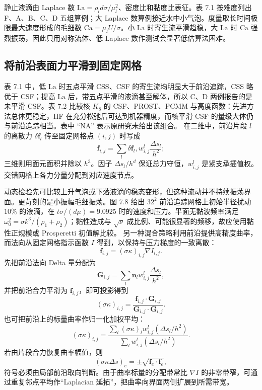 \documentclass[11pt,a4paper,openany,fontset=none]{ctexbook}
\begin{document}
静止液滴由 Laplace 数 $\mathrm{La}=\rho_l d\sigma/\mu_l^2$、密度比和黏度比表征。表 7.1 按难度列出 F、A、B、C、D 五组算例；大 Laplace 数算例接近水中小气泡。度量取长时间极限最大速度形成的毛细数 $\mathrm{Ca}=\mu_lU/\sigma$。小 $\mathrm{La}$ 时寄生流平滑趋稳，大 $\mathrm{La}$ 时 $\mathrm{Ca}$ 强烈振荡，因此只用对称流体、低 Laplace 数作测试会显著低估算法困难。
\subsection{将前沿表面力平滑到固定网格}

表 7.1 中，低 $\mathrm{La}$ 时五点平滑 CSS、CSF 的寄生流均明显大于前沿追踪，CSS 略优于 CSF；提高 $\mathrm{La}$ 后，带五点平滑的液滴甚至解体，所以 C、D 两例报告的是未平滑 CSF。表 7.2 比较核 $K_8$ 的 CSF、PROST、PCMM 与高度函数：先进方法总体更稳定，HF 在充分松弛后可达到机器精度，而核平滑 CSF 的量级大体仍与前沿追踪相当。表中 ``NA'' 表示原研究未给出该组合。
在二维中，前沿片段 $l$ 的离散力 $\delta\boldsymbol f_l$ 传至固定网格点 $(i,j)$ 时写成
\begin{equation}
 \boldsymbol f_{i,j}=\sum_l\delta\boldsymbol f_l,w^l_{i,j}
 \frac{\Delta s_l}{h^2};
 \tag{7.60}
\end{equation}
三维则用面元面积并除以 $h^3$。因子 $\Delta s_l/h^d$ 保证总力守恒，$w^l_{i,j}$ 是紧支承插值权。交错网格上各力分量分配到对应速度节点。

动态检验先可比较上升气泡或下落液滴的稳态变形，但这种流动并不持续振荡界面。更苛刻的是小振幅毛细振荡。图 7.8 给出 $32^2$ 前沿追踪网格上初始半径扰动 $10\%$ 的液滴，在 $t\sigma/(d\mu)=9.0925$ 时的速度和压力。平面无黏波频率满足 $\omega_0^2=\sigma k^3/(\rho_1+\rho_2)$；黏性造成与 $\sqrt\nu$ 成比例、可能很显著的频移，故应使用黏性正规模或 Prosperetti 初值解比较。
另一种混合策略利用前沿提供高精度曲率，而法向从固定网格指示函数 $I$ 得到，以保持与压力梯度的一致离散：
\begin{equation}
 \boldsymbol f_{i,j}=(\sigma\kappa)_{i,j}\nabla I_{i,j}.
 \tag{7.61}
\end{equation}
先把前沿法向 Delta 量分配为
\begin{equation}
 \boldsymbol G_{i,j}=\sum_l\boldsymbol n_lw^l_{i,j}\frac{\Delta s_l}{h^2},
 \tag{7.62}
\end{equation}
并把前沿合力平滑为 $\boldsymbol f_{i,j}$，即可投影得到
\begin{equation}
 (\sigma\kappa)_{i,j}
 =\frac{\boldsymbol f_{i,j}\cdot\boldsymbol G_{i,j}}
 {\boldsymbol G_{i,j}\cdot\boldsymbol G_{i,j}}.
 \tag{7.65}
\end{equation}
也可把前沿上的标量曲率作归一化加权平均：
\begin{equation}
 (\sigma\kappa)_{i,j}
 =\frac{\sum_l(\sigma\kappa)_lw^l_{i,j}(\Delta s_l/h^2)}
 {\sum_lw^l_{i,j}(\Delta s_l/h^2)}.
 \tag{7.66}
\end{equation}
若由片段合力恢复曲率幅值，则
\begin{equation}
 (\sigma\kappa\Delta s)_e=\pm\sqrt{\boldsymbol f_e\cdot\boldsymbol f_e},
 \tag{7.69}
\end{equation}
符号必须由局部前沿取向判断。由于曲率标量的分配带常比 $\nabla I$ 的非零带窄，可通过重复邻点平均作“Laplacian 延拓”，把曲率向界面两侧扩展到所需带宽。
\end{document}
